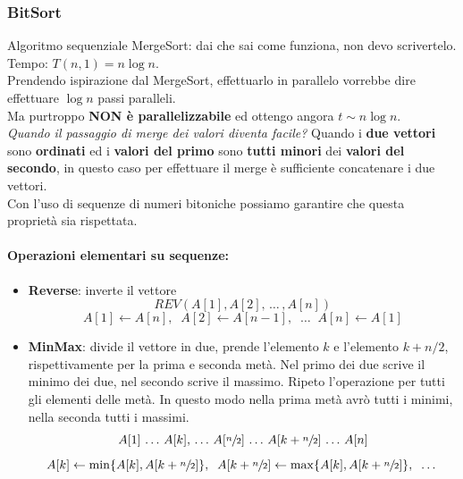 \documentclass[11pt]{article}
\begin{document}
	\newpage
	
	\subsubsection{BitSort}
	
	Algoritmo sequenziale MergeSort: dai che sai come funziona, non devo scrivertelo. Tempo: $T(n, 1) = n \log n$.\\
	
	Prendendo ispirazione dal MergeSort, effettuarlo in parallelo vorrebbe dire effettuare $\log n$ passi paralleli.\\
	
	Ma purtroppo \textbf{NON è parallelizzabile} ed ottengo angora $t \sim n \log n$.\\
	
	\textit{Quando il passaggio di merge dei valori diventa facile?} Quando i \textbf{due vettori} sono \textbf{ordinati} ed i \textbf{valori del primo} sono \textbf{tutti minori} dei \textbf{valori del secondo}, in questo caso per effettuare il merge è sufficiente concatenare i due vettori.\\
	
	Con l'uso di sequenze di numeri bitoniche possiamo garantire che questa proprietà sia rispettata.\\
	
	\paragraph{Operazioni elementari su sequenze: }
	\begin{itemize}
		\item \textbf{Reverse}: inverte il vettore
		$$ REV(A[1], A[2], \, \dots \, , A[n]) $$
		$$ A[1] \leftarrow A[n], \;\; A[2] \leftarrow A[n-1], \;\; \dots \;\; A[n] \leftarrow A[1] $$
		
		\item \textbf{MinMax}: divide il vettore in due, prende l'elemento $k$ e l'elemento $k + n/2$, rispettivamente per la prima e seconda metà. Nel primo dei due scrive il minimo dei due, nel secondo scrive il massimo. Ripeto l'operazione per tutti gli elementi delle metà. In questo modo nella prima metà avrò tutti i minimi, nella seconda tutti i massimi. 
		$$ A[1] \, \dots \, A[k], \, \dots \, A[\sfrac{n}{2}] \, \dots \, A[k + \sfrac{n}{2}] \, \dots \, A[n]$$
		 $$ A[k] \leftarrow \min \{A[k], A[k + \sfrac{n}{2}]\}, \;\; A[k + \sfrac{n}{2}] \leftarrow \max \{A[k], A[k + \sfrac{n}{2}]\}, \;\; \dots $$
	\end{itemize}
	
\end{document}
